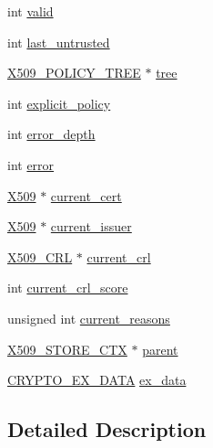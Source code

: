 \begin{DoxyCompactItemize}
\item 
int \hyperlink{structx509__store__ctx__st_ac63b1f168765a53e565a8ba27f5469d1}{valid}
\item 
int \hyperlink{structx509__store__ctx__st_a15b547649c8d99ff4999baf8a245327e}{last\+\_\+untrusted}
\item 
\hyperlink{crypto_2ossl__typ_8h_a3be68a7c4cbbe4954ccd27ff7215cf0d}{X509\+\_\+\+P\+O\+L\+I\+C\+Y\+\_\+\+T\+R\+EE} $\ast$ \hyperlink{structx509__store__ctx__st_a94a9b7fb654648f4a2c3cfa5fa82165b}{tree}
\item 
int \hyperlink{structx509__store__ctx__st_a16809d1e3dc16eebfc8de3661c0406eb}{explicit\+\_\+policy}
\item 
int \hyperlink{structx509__store__ctx__st_a4e4177051bd5e2166d93196b32a1d686}{error\+\_\+depth}
\item 
int \hyperlink{structx509__store__ctx__st_a11614f44ef4d939bdd984953346a7572}{error}
\item 
\hyperlink{crypto_2ossl__typ_8h_a4f666bde6518f95deb3050c54b408416}{X509} $\ast$ \hyperlink{structx509__store__ctx__st_adc32bddda40af88ed3789ecb4bb6ad81}{current\+\_\+cert}
\item 
\hyperlink{crypto_2ossl__typ_8h_a4f666bde6518f95deb3050c54b408416}{X509} $\ast$ \hyperlink{structx509__store__ctx__st_a3b6aaa7198949f40560b3818ad0280cc}{current\+\_\+issuer}
\item 
\hyperlink{crypto_2ossl__typ_8h_ac8661d2485c2c8da5fd7dd26b846f4bf}{X509\+\_\+\+C\+RL} $\ast$ \hyperlink{structx509__store__ctx__st_a3824790d4a76e33452fda3d757c0cc71}{current\+\_\+crl}
\item 
int \hyperlink{structx509__store__ctx__st_a5571723451c2bcedf238daf07a0ce497}{current\+\_\+crl\+\_\+score}
\item 
unsigned int \hyperlink{structx509__store__ctx__st_ab702b19ba6d22cb21b3a8c19350e8298}{current\+\_\+reasons}
\item 
\hyperlink{crypto_2ossl__typ_8h_ae681945a2cf88d6337137dc0260a1545}{X509\+\_\+\+S\+T\+O\+R\+E\+\_\+\+C\+TX} $\ast$ \hyperlink{structx509__store__ctx__st_ad2db3feac5b4b2406546a1156ca1f889}{parent}
\item 
\hyperlink{crypto_2ossl__typ_8h_a7eaff1c18057495d8af18f22d1370b51}{C\+R\+Y\+P\+T\+O\+\_\+\+E\+X\+\_\+\+D\+A\+TA} \hyperlink{structx509__store__ctx__st_ac3e4fd59d6ee44a81f3a58114613c1e2}{ex\+\_\+data}
\end{DoxyCompactItemize}


\subsection{Detailed Description}


